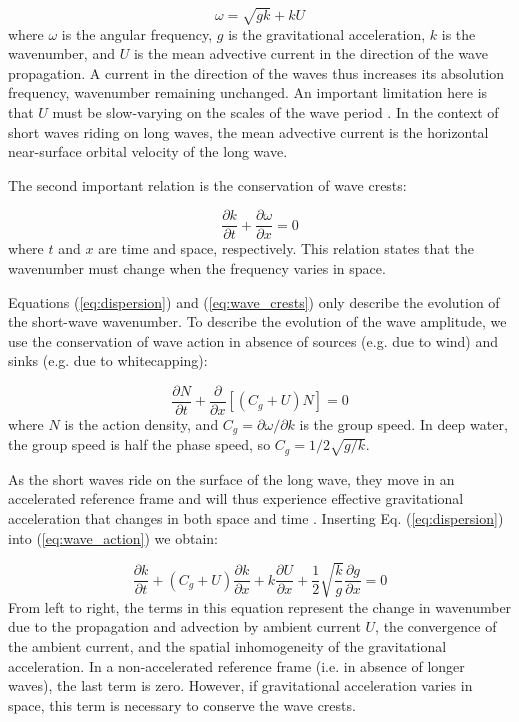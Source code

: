 \documentclass[draft]{agujournal2019}
\begin{document}
\begin{equation}
\label{eq:dispersion}
\omega = \sqrt{gk} + k U
\end{equation}
where $\omega$ is the angular frequency, $g$ is the gravitational acceleration,
$k$ is the wavenumber, and $U$ is the mean advective current in the direction
of the wave propagation.
A current in the direction of the waves thus increases its absolution frequency,
wavenumber remaining unchanged.
An important limitation here is that $U$ must be slow-varying on the scales of
the wave period \cite{bretherton1968wavetrains}.
In the context of short waves riding on long waves, the mean advective current
is the horizontal near-surface orbital velocity of the long wave.

The second important relation is the conservation of wave crests:

\begin{equation}
\label{eq:wave_crests}
\dfrac{\partial k}{\partial t}
+ \dfrac{\partial \omega}{\partial x}
= 0
\end{equation}
where $t$ and $x$ are time and space, respectively.
This relation states that the wavenumber must change when the frequency varies
in space.

Equations (\ref{eq:dispersion}) and (\ref{eq:wave_crests}) only describe the
evolution of the short-wave wavenumber.
To describe the evolution of the wave amplitude, we use the conservation of wave
action in absence of sources (e.g. due to wind) and sinks (e.g. due to whitecapping):

\begin{equation}
\label{eq:wave_action}
\dfrac{\partial N}{\partial t}
+ \dfrac{\partial}{\partial x} \left[\left(C_g + U\right)N\right]
= 0
\end{equation}
where $N$ is the action density, and $C_g = \partial \omega / \partial k$ is the
group speed.
In deep water, the group speed is half the phase speed, so $C_g = 1/2\sqrt{g/k}$.

As the short waves ride on the surface of the long wave,
they move in an accelerated reference frame and will thus experience effective
gravitational acceleration that changes in both space and time \cite{longuet1986eulerian,longuet1987propagation}.
Inserting Eq. (\ref{eq:dispersion}) into (\ref{eq:wave_action}) we obtain:

\begin{equation}
\label{eq:wavenumber}
\dfrac{\partial k}{\partial t}
+ \left(C_g + U\right) \dfrac{\partial k}{\partial x}
+ k \dfrac{\partial U}{\partial x}
+ \dfrac{1}{2} \sqrt{\dfrac{k}{g}} \dfrac{\partial g}{\partial x}
= 0
\end{equation}
From left to right, the terms in this equation represent the change in wavenumber
due to the propagation and advection by ambient current $U$, the convergence of
the ambient current, and the spatial inhomogeneity of the gravitational acceleration.
In a non-accelerated reference frame (i.e. in absence of longer waves), the last
term is zero.
However, if gravitational acceleration varies in space, this term is necessary
to conserve the wave crests.
\end{document}
